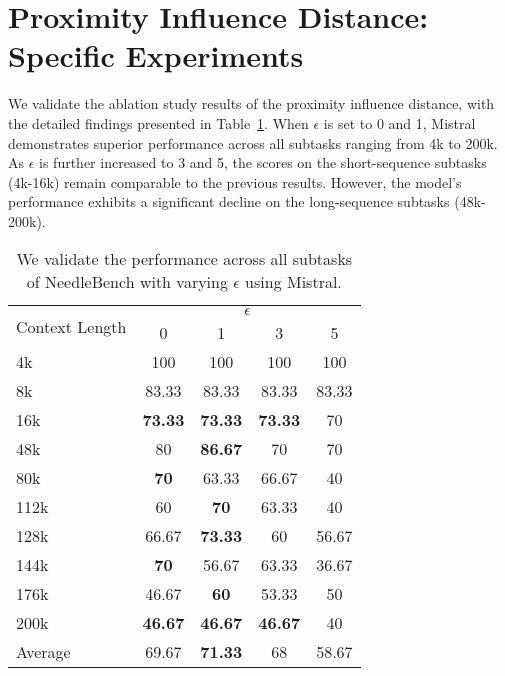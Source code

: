 \section{Proximity Influence Distance: Specific Experiments} \label{appen_proxi_influ}
We validate the ablation study results of the proximity influence distance, with the detailed findings presented in Table~\ref{tab:proximity_influence_distance_details}. 
When \( \epsilon \) is set to 0 and 1, Mistral demonstrates superior performance across all subtasks ranging from 4k to 200k. 
As \( \epsilon \) is further increased to 3 and 5, the scores on the short-sequence subtasks (4k-16k) remain comparable to the previous results. 
However, the model's performance exhibits a significant decline on the long-sequence subtasks (48k-200k).
\begin{table}[]
\begin{tabular}{l|cccc}
\hline
\multirow{2}{*}{Context Length} & \multicolumn{4}{c}{$\epsilon$}                 \\
                                & 0              & 1              & 3              & 5     \\ \hline
4k                              & 100            & 100            & 100            & 100   \\
8k                              & 83.33          & 83.33          & 83.33          & 83.33 \\
16k                             & \textbf{73.33} & \textbf{73.33} & \textbf{73.33} & 70    \\
48k                             & 80             & \textbf{86.67} & 70          & 70 \\
80k                             & \textbf{70}    & 63.33          & 66.67          & 40    \\
112k                            & 60 & \textbf{70} & 63.33          & 40    \\
128k                            & 66.67          & \textbf{73.33} & 60             & 56.67 \\
144k                            & \textbf{70}    & 56.67             & 63.33             & 36.67 \\
176k                            & 46.67             & \textbf{60} & 53.33          & 50    \\
200k                            & \textbf{46.67} & \textbf{46.67}             & \textbf{46.67}          & 40 \\ \hline
Average                         & 69.67             & \textbf{71.33}    & 68          & 58.67 \\ \hline
\end{tabular}
  \caption{We validate the performance across all subtasks of NeedleBench with varying \( \epsilon \) using Mistral.}
  \label{tab:proximity_influence_distance_details}
  \end{table}

